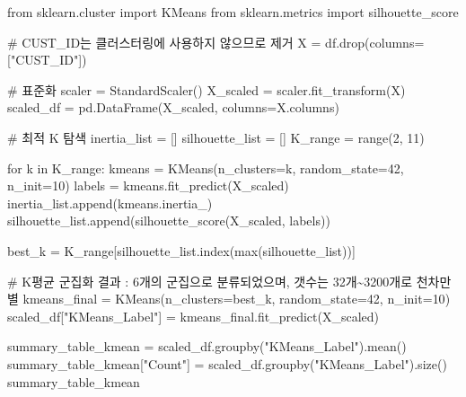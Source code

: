 \documentclass[
  a4paper,
  DIV=11,
  numbers=noendperiod]{scrreprt}
\newenvironment{Shaded}{\begin{snugshade}}{\end{snugshade}}
\newcommand{\BuiltInTok}[1]{\textcolor[rgb]{0.00,0.23,0.31}{#1}}
\newcommand{\CommentTok}[1]{\textcolor[rgb]{0.37,0.37,0.37}{#1}}
\newcommand{\ControlFlowTok}[1]{\textcolor[rgb]{0.00,0.23,0.31}{#1}}
\newcommand{\DecValTok}[1]{\textcolor[rgb]{0.68,0.00,0.00}{#1}}
\newcommand{\ImportTok}[1]{\textcolor[rgb]{0.00,0.46,0.62}{#1}}
\newcommand{\KeywordTok}[1]{\textcolor[rgb]{0.00,0.23,0.31}{#1}}
\newcommand{\NormalTok}[1]{\textcolor[rgb]{0.00,0.23,0.31}{#1}}
\newcommand{\OperatorTok}[1]{\textcolor[rgb]{0.37,0.37,0.37}{#1}}
\newcommand{\StringTok}[1]{\textcolor[rgb]{0.13,0.47,0.30}{#1}}
\begin{document}
\begin{Shaded}
\begin{Highlighting}[]
\ImportTok{from}\NormalTok{ sklearn.cluster }\ImportTok{import}\NormalTok{ KMeans}
\ImportTok{from}\NormalTok{ sklearn.metrics }\ImportTok{import}\NormalTok{ silhouette\_score}

\CommentTok{\# CUST\_ID는 클러스터링에 사용하지 않으므로 제거}
\NormalTok{X }\OperatorTok{=}\NormalTok{ df.drop(columns}\OperatorTok{=}\NormalTok{[}\StringTok{"CUST\_ID"}\NormalTok{])}

\CommentTok{\# 표준화}
\NormalTok{scaler }\OperatorTok{=}\NormalTok{ StandardScaler()}
\NormalTok{X\_scaled }\OperatorTok{=}\NormalTok{ scaler.fit\_transform(X)}
\NormalTok{scaled\_df }\OperatorTok{=}\NormalTok{ pd.DataFrame(X\_scaled, columns}\OperatorTok{=}\NormalTok{X.columns)}

\CommentTok{\# 최적 K 탐색}
\NormalTok{inertia\_list }\OperatorTok{=}\NormalTok{ []}
\NormalTok{silhouette\_list }\OperatorTok{=}\NormalTok{ []}
\NormalTok{K\_range }\OperatorTok{=} \BuiltInTok{range}\NormalTok{(}\DecValTok{2}\NormalTok{, }\DecValTok{11}\NormalTok{)}

\ControlFlowTok{for}\NormalTok{ k }\KeywordTok{in}\NormalTok{ K\_range:}
\NormalTok{    kmeans }\OperatorTok{=}\NormalTok{ KMeans(n\_clusters}\OperatorTok{=}\NormalTok{k, random\_state}\OperatorTok{=}\DecValTok{42}\NormalTok{, n\_init}\OperatorTok{=}\DecValTok{10}\NormalTok{)}
\NormalTok{    labels }\OperatorTok{=}\NormalTok{ kmeans.fit\_predict(X\_scaled)}
\NormalTok{    inertia\_list.append(kmeans.inertia\_)}
\NormalTok{    silhouette\_list.append(silhouette\_score(X\_scaled, labels))}

\NormalTok{best\_k }\OperatorTok{=}\NormalTok{ K\_range[silhouette\_list.index(}\BuiltInTok{max}\NormalTok{(silhouette\_list))]}

\CommentTok{\# K평균 군집화 결과 : 6개의 군집으로 분류되었으며, 갯수는 32개\textasciitilde{}3200개로 천차만별}
\NormalTok{kmeans\_final }\OperatorTok{=}\NormalTok{ KMeans(n\_clusters}\OperatorTok{=}\NormalTok{best\_k, random\_state}\OperatorTok{=}\DecValTok{42}\NormalTok{, n\_init}\OperatorTok{=}\DecValTok{10}\NormalTok{)}
\NormalTok{scaled\_df[}\StringTok{"KMeans\_Label"}\NormalTok{] }\OperatorTok{=}\NormalTok{ kmeans\_final.fit\_predict(X\_scaled)}

\NormalTok{summary\_table\_kmean }\OperatorTok{=}\NormalTok{ scaled\_df.groupby(}\StringTok{"KMeans\_Label"}\NormalTok{).mean()}
\NormalTok{summary\_table\_kmean[}\StringTok{"Count"}\NormalTok{] }\OperatorTok{=}\NormalTok{ scaled\_df.groupby(}\StringTok{"KMeans\_Label"}\NormalTok{).size()}
\NormalTok{summary\_table\_kmean}
\end{Highlighting}
\end{Shaded}
\end{document}
